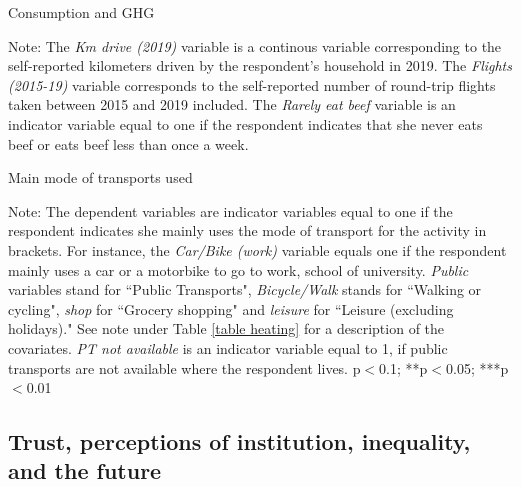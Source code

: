 \documentclass{article}
\begin{document}
\begin{table}[h!]
	\caption{Consumption and GHG}
	\begin{center}
		\scalebox{0.7}{}
	\end{center}
	{\footnotesize Note: The \textit{Km drive (2019)} variable is a continous variable corresponding to the self-reported kilometers driven by the respondent's household in 2019. The \textit{Flights (2015-19)} variable corresponds to the self-reported number of round-trip flights taken between 2015 and 2019 included. The \textit{Rarely eat beef} variable is an indicator variable equal to one if the respondent indicates that she never eats beef or eats beef less than once a week.}
\end{table}	

\begin{landscape}
\begin{table}[h!]
	\caption{Main mode of transports used}
	\begin{center}
		\scalebox{0.6}{}
	\end{center}
	{\footnotesize Note: The dependent variables are indicator variables equal to one if the respondent indicates she mainly uses the mode of transport for the activity in brackets. For instance, the \textit{Car/Bike (work)} variable equals one if the respondent mainly uses a car or a motorbike to go to work, school of university. \textit{Public} variables stand for ``Public Transports", \textit{Bicycle/Walk} stands for ``Walking or cycling", \textit{shop} for ``Grocery shopping" and \textit{leisure} for ``Leisure (excluding holidays)."
	See note under Table \ref{table heating} for a description of the covariates. \textit{PT not available} is an indicator variable equal to 1, if public transports are not available where the respondent lives.
	\newline *p$<$0.1; **p$<$0.05; ***p$<$0.01}	
\end{table}	
\end{landscape}

\clearpage
\subsection{Trust, perceptions of institution, inequality, and the future}
\end{document}
